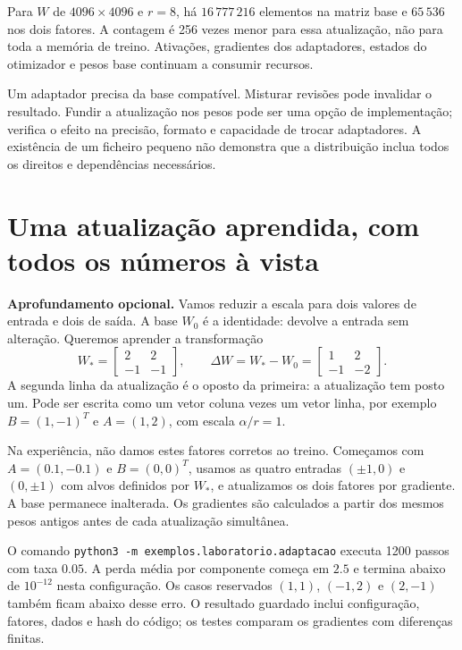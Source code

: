Para $W$ de $4096\times4096$ e $r=8$, há $16\,777\,216$ elementos na matriz base e $65\,536$ nos dois fatores. A contagem é 256 vezes menor para essa atualização, não para toda a memória de treino. Ativações, gradientes dos adaptadores, estados do otimizador e pesos base continuam a consumir recursos.

Um adaptador precisa da base compatível. Misturar revisões pode invalidar o resultado. Fundir a atualização nos pesos pode ser uma opção de implementação; verifica o efeito na precisão, formato e capacidade de trocar adaptadores. A existência de um ficheiro pequeno não demonstra que a distribuição inclua todos os direitos e dependências necessários.

\section{Uma atualização aprendida, com todos os números à vista}
\textbf{Aprofundamento opcional.} Vamos reduzir a escala para dois valores de entrada e dois de saída. A base $W_0$ é a identidade: devolve a entrada sem alteração. Queremos aprender a transformação
\[
W_* = \begin{bmatrix}2&2\\-1&-1\end{bmatrix},
\qquad
\Delta W=W_*-W_0=\begin{bmatrix}1&2\\-1&-2\end{bmatrix}.
\]
A segunda linha da atualização é o oposto da primeira: a atualização tem posto um. Pode ser escrita como um vetor coluna vezes um vetor linha, por exemplo $B=(1,-1)^T$ e $A=(1,2)$, com escala $\alpha/r=1$.

Na experiência, não damos estes fatores corretos ao treino. Começamos com $A=(0.1,-0.1)$ e $B=(0,0)^T$, usamos as quatro entradas $(\pm1,0)$ e $(0,\pm1)$ com alvos definidos por $W_*$, e atualizamos os dois fatores por gradiente. A base permanece inalterada. Os gradientes são calculados a partir dos mesmos pesos antigos antes de cada atualização simultânea.

O comando \texttt{python3 -m exemplos.laboratorio.adaptacao} executa 1200 passos com taxa $0.05$. A perda média por componente começa em $2.5$ e termina abaixo de $10^{-12}$ nesta configuração. Os casos reservados $(1,1)$, $(-1,2)$ e $(2,-1)$ também ficam abaixo desse erro. O resultado guardado inclui configuração, fatores, dados e hash do código; os testes comparam os gradientes com diferenças finitas.

